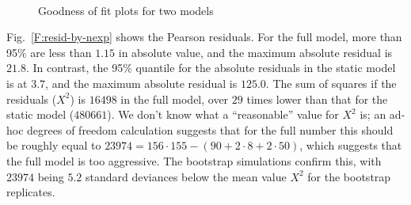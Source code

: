 \documentclass[final]{statsoc}
\begin{document}
\begin{figure}
  \centering
  \\
  \caption{\label{F:goodness}
    Goodness of fit plots for two models
  }
\end{figure}

Fig.~\ref{F:resid-by-nexp} shows the Pearson residuals.  For the full model,
more than 95\% are less than $1.15$ in absolute value, and the maximum
absolute residual is $21.8$.  In contrast, the 95\% quantile for the absolute
residuals in the static model is at $3.7$, and the maximum absolute residual
is $125.0$.  The sum of squares if the residuals ($X^2$) is $16498$ in the
full model, over $29$ times lower than that for the static model ($480661$).
We don't know what a ``reasonable'' value for $X^2$ is; an ad-hoc degrees of
freedom calculation suggests that for the full number this should be roughly
equal to $23974 = 156 \cdot 155 - (90 + 2 \cdot 8 + 2 \cdot 50)$, which
suggests that the full model is too aggressive.  The bootstrap simulations
confirm this, with $23974$ being $5.2$ standard deviances below the mean
value $X^2$ for the bootstrap replicates.
\end{document}
